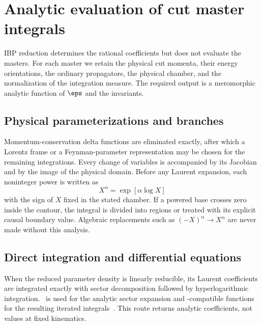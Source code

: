 \section{Analytic evaluation of cut master integrals}
\label{sec:analytic-masters}

IBP reduction determines the rational coefficients but does not evaluate the
masters.  For each master we retain the physical cut momenta, their energy
orientations, the ordinary propagators, the physical chamber, and the
normalization of the integration measure.  The required output is a
meromorphic analytic function of $\eps$ and the invariants.

\subsection{Physical parameterizations and branches}

Momentum-conservation delta functions are eliminated exactly, after which a
Lorentz frame or a Feynman-parameter representation may be chosen for the
remaining integrations.  Every change of variables is accompanied by its
Jacobian and by the image of the physical domain.  Before any Laurent
expansion, each noninteger power is written as
\begin{equation}
 X^\alpha=\exp[\alpha\log X]
 \label{eq:real-power-definition}
\end{equation}
with the sign of $X$ fixed in the stated chamber.  If a powered base crosses
zero inside the contour, the integral is divided into regions or treated with
its explicit causal boundary value.  Algebraic replacements such as
$(-X)^\alpha\to X^\alpha$ are never made without this analysis.

\subsection{Direct integration and differential equations}

When the reduced parameter density is linearly reducible, its Laurent
coefficients are integrated exactly with sector decomposition followed by
hyperlogarithmic integration.  \SubTropica\ is used for the analytic sector
expansion and \HyperInt-compatible functions for the resulting iterated
integrals~\cite{Giroux:2026tgd,Panzer:2014caa}.  This route returns analytic
coefficients, not values at fixed kinematics.

